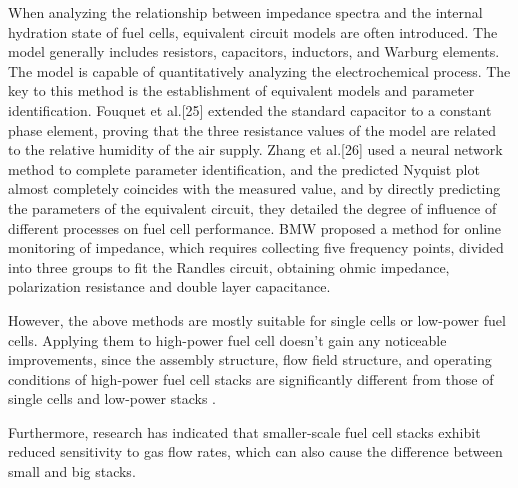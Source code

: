 \par
When analyzing the relationship between impedance spectra and the internal hydration state of fuel cells, equivalent circuit models are often introduced. The model generally includes resistors, capacitors, inductors, and Warburg elements\cite{tangRecentProgressUse2020}. The model is capable of quantitatively analyzing the electrochemical process.  The key to this method is the establishment of equivalent models and parameter identification. Fouquet et al.[25] extended the standard capacitor to a constant phase element, proving that the three resistance values of the model are related to the relative humidity of the air supply. Zhang et al.[26] used a neural network method to complete parameter identification, and the predicted Nyquist plot almost completely coincides with the measured value, and by directly predicting the parameters of the equivalent circuit, they detailed the degree of influence of different processes on fuel cell performance. BMW proposed a method for online monitoring of impedance, which requires collecting five frequency points, divided into three groups to fit the Randles circuit, obtaining ohmic impedance, polarization resistance and double layer capacitance\cite{fouquetModelBasedPEM2006}.
\par
However, the above methods are mostly suitable for single cells or low-power fuel cells. Applying them to high-power fuel cell doesn't gain any noticeable improvements\cite{tangRecentProgressUse2020,jiangMicrobialFuelCell2018,dotelliCombiningElectricalPressure2016,millerReviewPolymerElectrolyte2011,nagulapatiMachineLearningBased2023}, since the assembly structure, flow field structure, and operating conditions of high-power fuel cell stacks are significantly different from those of single cells and low-power stacks \cite{verhaertWaterManagementAlkaline2011}.
\par
Furthermore, research has indicated that smaller-scale fuel cell stacks exhibit reduced sensitivity to gas flow rates\cite{bonnetDesign80kWePEM2008}, which can also cause the difference between small and big stacks.

